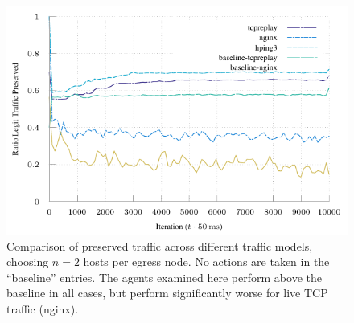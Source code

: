 \documentclass[conference, letterpaper, 10pt, times]{IEEEtran}
\begin{document}

\begin{figure}
	\includegraphics[width=\linewidth]{../plots/online-varyN-nginx}
	\caption{
		Comparison of preserved traffic across different traffic models, choosing $n=2$ hosts per egress node.
		No actions are taken in the ``baseline'' entries.
		The agents examined here perform above the baseline in all cases, but perform significantly worse for live TCP traffic (nginx).
		\label{fig:nginx-coffin-nail}
	}
\end{figure}
\end{document}
